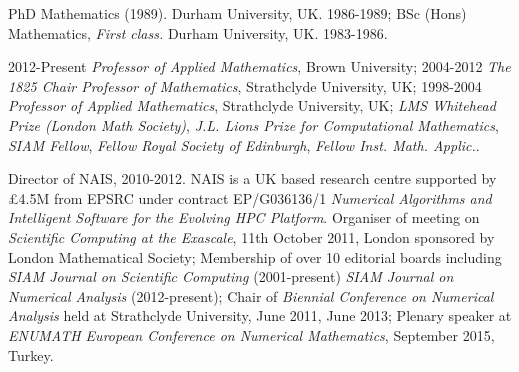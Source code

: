 
%


       PhD Mathematics (1989). Durham University, UK. 1986-1989;
       BSc (Hons) Mathematics, {\em First class.} Durham University,
       UK. 1983-1986.

     2012-Present \emph{Professor of Applied Mathematics}, Brown
         University;
     2004-2012 \emph{The 1825 Chair Professor of Mathematics},
         Strathclyde University, UK;
     1998-2004 \emph{Professor of Applied Mathematics}, Strathclyde
         University, UK;
	 \emph{LMS Whitehead Prize (London Math Society)},  
	 \emph{J.L. Lions Prize for Computational Mathematics},
	 \emph{SIAM Fellow},
	 \emph{Fellow Royal Society of Edinburgh},
	 \emph{Fellow Inst. Math. Applic.}.

  \nocite{Ainsworth+Andriamaro+etal:Bernstein-Bezier}
  \nocite{Ainsworth+Rankin:Guaranteed}
  \nocite{Ainsworth:synthesis}
  \nocite{Ainsworth+Oden:book}
  \nocite{Ainsworth+Rankin:Robust}
  \nocite{Ainsworth+Rankin:Quantities}
  \nocite{Ainsworth+Ma:Non-uniform}
  \nocite{Ainsworth+Vejchodsky:Fully}
  \nocite{Ainsworth+Senior:Aspects}
  \nocite{Ainsworth:framework}
  
  
        Director of NAIS, 2010-2012. NAIS is a UK based research
            centre supported by \pounds 4.5M from EPSRC under contract
            EP/G036136/1 {\em Numerical Algorithms and Intelligent Software
            for the Evolving HPC Platform}. 
        Organiser of meeting on {\em Scientific Computing at the
            Exascale}, 11th October 2011, London sponsored by London
            Mathematical Society;
        Membership of over 10 editorial boards including {\em SIAM Journal on Scientific
            Computing} (2001-present) {\em SIAM Journal on Numerical Analysis}
            (2012-present);
        Chair of {\em Biennial Conference on Numerical Analysis} held
            at Strathclyde University, June 2011, June 2013;
	Plenary speaker at {\em ENUMATH European Conference on Numerical Mathematics},
            September 2015, Turkey. 

